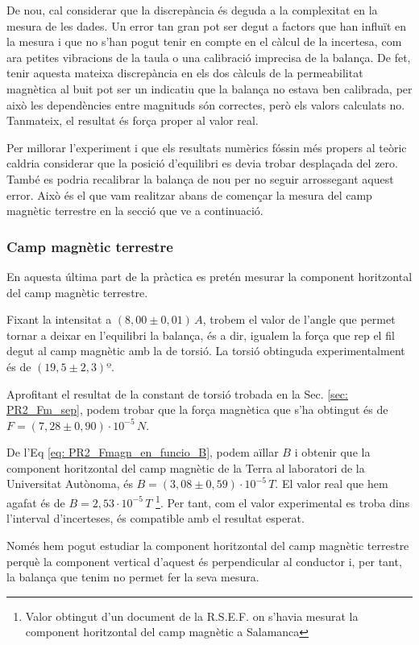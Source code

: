 \documentclass[11pt]{article}
\numberwithin{equation}{section}
\numberwithin{figure}{section}
\numberwithin{table}{section}
\begin{document}
De nou, cal considerar que la discrepància és deguda a la complexitat en la mesura de les dades. Un error tan gran pot ser degut a factors que han influït en la mesura i que no s’han pogut tenir en compte en el càlcul de la incertesa, com ara petites vibracions de la taula o una calibració imprecisa de la balança. De fet, tenir aquesta mateixa discrepància en els dos càlculs de la permeabilitat magnètica al buit pot ser un indicatiu que la balança no estava ben calibrada, per això les dependències entre magnituds són correctes, però els valors calculats no. Tanmateix, el resultat és força proper al valor real.

Per millorar l'experiment i que els resultats numèrics fóssin més propers al teòric caldria considerar que la posició d'equilibri es devia trobar desplaçada del zero. També es podria recalibrar la balança de nou per no seguir arrossegant aquest error. Això és el que vam realitzar abans de començar la mesura del camp magnètic terrestre en la secció que ve a continuació.

\subsubsection{Camp magnètic terrestre}\label{sec: PR2_Bterra}

En aquesta última part de la pràctica es pretén mesurar la component horitzontal del camp magnètic terrestre. 

Fixant la intensitat a $(8,00 \pm 0,01)\,A$, trobem el valor de l'angle que permet tornar a deixar en l'equilibri la balança, és a dir, igualem la força que rep el fil degut al camp magnètic amb la de torsió. La torsió obtinguda experimentalment és de $(19,5 \pm 2,3)º$. 

Aprofitant el resultat de la constant de torsió trobada en la Sec. \ref{sec: PR2_Fm_sep}, podem trobar que la força magnètica que s’ha obtingut és de $F = (7,28 \pm 0,90) \cdot 10^{-5}\,N$. 

De l’Eq \eqref{eq: PR2_Fmagn_en_funcio_B}, podem aïllar $B$ i obtenir que la component horitzontal del camp magnètic de la Terra al laboratori de la Universitat Autònoma, és $B = (3,08 \pm 0,59)·10^{-5}\,T$. El valor real que hem agafat és de $B = 2,53·10^{-5}\,T$ \footnote{Valor obtingut d'un document de la R.S.E.F. on s'havia mesurat la component horitzontal del camp magnètic a Salamanca}. Per tant, com el valor experimental es troba dins l’interval d’incerteses, és compatible amb el resultat esperat.

Només hem pogut estudiar la component horitzontal del camp magnètic terrestre perquè la component vertical d’aquest és perpendicular al conductor i, per tant, la balança que tenim no permet fer la seva mesura.
\end{document}
